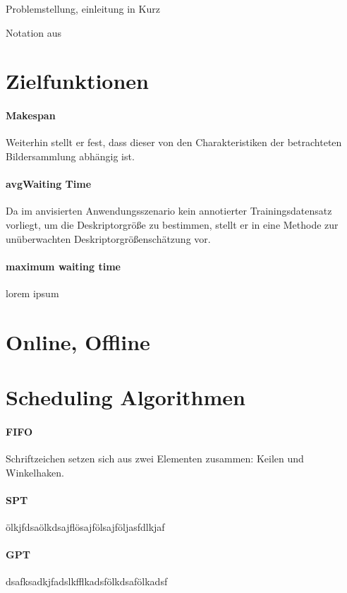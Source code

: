Problemstellung, einleitung in Kurz

Notation aus

\section{Zielfunktionen}

\paragraph{Makespan}

Weiterhin stellt er fest, dass dieser von den Charakteristiken der betrachteten Bildersammlung abhängig ist. 
\paragraph{avgWaiting Time}
Da im anvisierten Anwendungsszenario kein annotierter Trainingsdatensatz vorliegt, um die Deskriptorgröße zu bestimmen, 
stellt er in \cite[Kap. 5.4.1]{LDiss} eine Methode zur unüberwachten Deskriptorgrößenschätzung vor.

\paragraph{maximum waiting time}
lorem ipsum

\section{Online, Offline}

\section{Scheduling Algorithmen}

\paragraph{FIFO}
Schriftzeichen setzen sich aus zwei Elementen zusammen: Keilen und Winkelhaken. 

\paragraph{SPT}
ölkjfdsaölkdsajflösajfölsajföljasfdlkjaf

\paragraph{GPT}
dsafksadkjfadslkfflkadsfölkdsafölkadsf

